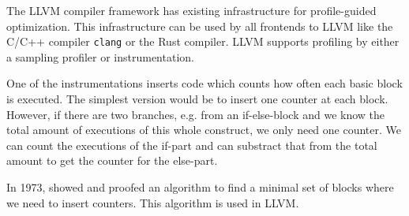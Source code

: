 \clearpage
{}
The LLVM compiler framework has existing infrastructure for profile-guided optimization. This infrastructure can be used by all frontends to LLVM like the C/C++ compiler \texttt{clang} or the Rust compiler. LLVM supports profiling by either a sampling profiler or instrumentation.

One of the instrumentations inserts code which counts how often each basic block is executed. The simplest version would be to insert one counter at each block. However, if there are two branches, e.g. from an if-else-block and we know the total amount of executions of this whole construct, we only need one counter. We can count the executions of the if-part and can substract that from the total amount to get the counter for the else-part.

In 1973, \citet{Knuth1973} showed and proofed an algorithm to find a minimal set of blocks where we need to insert counters. This algorithm is used in LLVM.